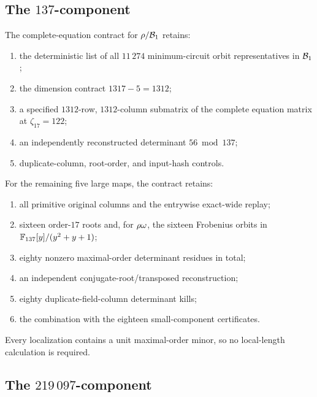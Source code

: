 \subsection{The \(137\)-component}

The complete-equation contract for \(\rho/\mathcal B_1\) retains:
\begin{enumerate}
  \item the deterministic list of all \(11\,274\) minimum-circuit orbit
  representatives in \(\mathcal B_1\);
  \item the dimension contract \(1317-5=1312\);
  \item a specified \(1312\)-row, \(1312\)-column submatrix of the
  complete equation matrix at \(\zeta_{17}=122\);
  \item an independently reconstructed determinant \(56\bmod137\);
  \item duplicate-column, root-order, and input-hash controls.
\end{enumerate}

For the remaining five large maps, the contract retains:
\begin{enumerate}
  \item all primitive original columns and the entrywise exact-wide replay;
  \item sixteen order-\(17\) roots and, for \(\rho\omega\), the sixteen
  Frobenius orbits in \(\mathbb F_{137}[y]/(y^2+y+1)\);
  \item eighty nonzero maximal-order determinant residues in total;
  \item an independent conjugate-root/transposed reconstruction;
  \item eighty duplicate-field-column determinant kills;
  \item the combination with the eighteen small-component certificates.
\end{enumerate}
Every localization contains a unit maximal-order minor, so no local-length
calculation is required.

\subsection{The \(219\,097\)-component}

